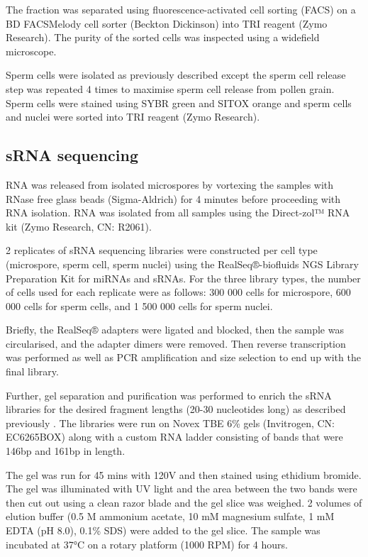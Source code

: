 The fraction was separated using fluorescence-activated cell sorting (FACS) on a BD FACSMelody cell sorter (Beckton Dickinson) into TRI reagent (Zymo Research). The purity of the sorted cells was inspected using a widefield microscope.

Sperm cells were isolated as previously described \cite{RN140,RN141} except the sperm cell release step was repeated 4 times to maximise sperm cell release from pollen grain. Sperm cells were stained using SYBR green and SITOX orange and sperm cells and nuclei were sorted into TRI reagent (Zymo Research).

\subsection{sRNA sequencing}

RNA was released from isolated microspores by vortexing the samples with RNase free glass beads (Sigma-Aldrich) for 4 minutes before proceeding with RNA isolation. RNA was isolated from all samples using the Direct-zol™ RNA kit (Zymo Research, CN: R2061).

2 replicates of sRNA sequencing libraries were constructed per cell type (microspore, sperm cell, sperm nuclei) using the RealSeq®-biofluids NGS Library Preparation Kit for miRNAs and sRNAs. For the three library types, the number of cells used for each replicate were as follows: 300 000 cells for microspore, 600 000 cells for sperm cells, and 1 500 000 cells for sperm nuclei.

Briefly, the RealSeq® adapters were ligated and blocked, then the sample was circularised, and the adapter dimers were removed. Then reverse transcription was performed as well as PCR amplification and size selection to end up with the final library.

Further, gel separation  and purification was performed to enrich the sRNA libraries for the desired fragment lengths (20-30 nucleotides long) as described previously \cite{RN187}. The libraries were run on Novex TBE 6\% gels (Invitrogen, CN: EC6265BOX) along with a custom RNA ladder consisting of bands that were 146bp and 161bp in length. 

The gel was run for 45 mins with 120V and then stained using ethidium bromide. The gel was illuminated with UV light and the area between the two bands were then cut out using a clean razor blade and the gel slice was weighed. 2 volumes of elution buffer (0.5 M ammonium acetate, 10 mM magnesium sulfate, 1 mM EDTA (pH 8.0), 0.1\% SDS) were added to the gel slice. The sample was incubated at 37°C on a rotary platform (1000 RPM) for 4 hours. 

